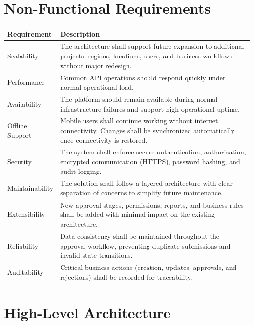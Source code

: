 \documentclass[11pt]{article}
\begin{document}
\section{Non-Functional Requirements}

\renewcommand{\arraystretch}{1.25}
\begin{tabularx}{\textwidth}{|>{\raggedright\arraybackslash}p{}|>{\raggedright\arraybackslash}X|}
    \hline
    \textbf{Requirement} & \textbf{Description} \\
    \hline
    Scalability & The architecture shall support future expansion to additional
    projects, regions, locations, users, and business workflows without major
    redesign. \\
    \hline
    Performance & Common API operations should respond quickly under normal
    operational load. \\
    \hline
    Availability & The platform should remain available during normal
    infrastructure failures and support high operational uptime. \\
    \hline
    Offline Support & Mobile users shall continue working without internet
    connectivity. Changes shall be synchronized automatically once connectivity
    is restored. \\
    \hline
    Security & The system shall enforce secure authentication, authorization,
    encrypted communication (HTTPS), password hashing, and audit logging. \\
    \hline
    Maintainability & The solution shall follow a layered architecture with
    clear separation of concerns to simplify future maintenance. \\
    \hline
    Extensibility & New approval stages, permissions, reports, and business
    rules shall be added with minimal impact on the existing architecture. \\
    \hline
    Reliability & Data consistency shall be maintained throughout the approval
    workflow, preventing duplicate submissions and invalid state transitions. \\
    \hline
    Auditability & Critical business actions (creation, updates, approvals, and
    rejections) shall be recorded for traceability. \\
    \hline
\end{tabularx}
\renewcommand{\arraystretch}{1}

\clearpage
\section{High-Level Architecture}
\end{document}
